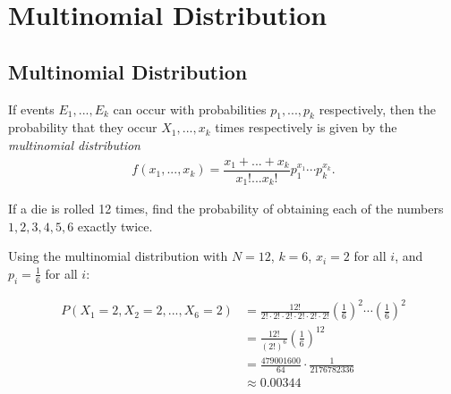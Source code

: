 \section{Multinomial Distribution}
\subsection{Multinomial Distribution}

If events $E_{1},...,E_{k}$ can occur with probabilities $p_{1},...,p_{k}$ respectively, then the probability that they occur $X_{1},...,x_{k}$ times respectively is given by the \emph{multinomial distribution}
\begin{align}
 \label{eq:2.10.8}
 f\left( x_{1},...,x_{k} \right)=
 \dfrac{x_{1}+...+x_{k}}{x_{1}!...x_{k}!}p_{1}^{x_{1}}\cdots p_{k}^{x_{k}}.
\end{align}

\begin{ejemplo}
  \label{exmp:2.10.6}
  If a die is rolled 12 times, find the probability of obtaining each of the numbers $1,2,3,4,5,6$ exactly twice.
\end{ejemplo}

\begin{solucion}
	Using the multinomial distribution with $N=12$, $k=6$, $x_i = 2$ for all $i$, and $p_i = \frac{1}{6}$ for all $i$:

	\begin{align}
		P(X_1=2, X_2=2, ..., X_6=2) &= \frac{12!}{2! \cdot 2! \cdot 2! \cdot 2! \cdot 2! \cdot 2!} \left(\frac{1}{6}\right)^2 \cdots \left(\frac{1}{6}\right)^2 \\
		&= \frac{12!}{(2!)^6} \left(\frac{1}{6}\right)^{12} \\
		&= \frac{479001600}{64} \cdot \frac{1}{2176782336} \\
		&\approx 0.00344
	\end{align}
\end{solucion}
